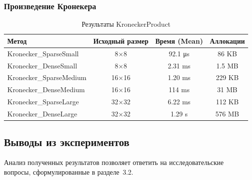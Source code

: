\documentclass[a4paper]{article}
\begin{document}
\subsubsection{Произведение Кронекера}

\begin{table}[H]
\centering
\caption{Результаты KroneckerProduct}
\begin{tabular}{lccc}
\toprule
Метод & Исходный размер & Время (Mean) & Аллокации \\
\midrule
Kronecker\_SparseSmall & 8×8 & 92.1 μs & 86 KB \\
Kronecker\_DenseSmall & 8×8 & 2.31 ms & 1.5 MB \\
Kronecker\_SparseMedium & 16×16 & 1.20 ms & 229 KB \\
Kronecker\_DenseMedium & 16×16 & 114 ms & 31 MB \\
Kronecker\_SparseLarge & 32×32 & 6.22 ms & 112 KB \\
Kronecker\_DenseLarge & 32×32 & 1.29 s & 576 MB \\
\bottomrule
\end{tabular}
\end{table}

\subsection{Выводы из экспериментов}

Анализ полученных результатов позволяет ответить на исследовательские вопросы, сформулированные в разделе~3.2.
\end{document}
